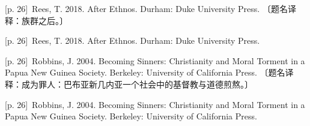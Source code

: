 \documentclass[10pt,a4paper]{article}
\begin{document}
\noindent\begin{minipage}{\textwidth}\begin{minipage}[t]{\dimexpr.5\textwidth-4mm\relax}\noindent\begin{minipage}[t]{\linewidth}{\scriptsize\color{gray} [p. 26]}\ Rees, T. 2018. After Ethnos. Durham: Duke University Press. 〔题名译释：族群之后。〕\par\end{minipage}\par\end{minipage}\hfill\begin{minipage}[t]{\dimexpr.5\textwidth-4mm\relax}\noindent\begin{minipage}[t]{\linewidth}{\scriptsize\color{gray} [p. 26]}\ Rees, T. 2018. After Ethnos. Durham: Duke University Press.\par\end{minipage}\par\end{minipage}\end{minipage}\par
\noindent\begin{minipage}{\textwidth}\begin{minipage}[t]{\dimexpr.5\textwidth-4mm\relax}\noindent\begin{minipage}[t]{\linewidth}{\scriptsize\color{gray} [p. 26]}\ Robbins, J. 2004. Becoming Sinners: Christianity and Moral Torment in a Papua New Guinea Society. Berkeley: University of California Press. 〔题名译释：成为罪人：巴布亚新几内亚一个社会中的基督教与道德煎熬。〕\par\end{minipage}\par\end{minipage}\hfill\begin{minipage}[t]{\dimexpr.5\textwidth-4mm\relax}\noindent\begin{minipage}[t]{\linewidth}{\scriptsize\color{gray} [p. 26]}\ Robbins, J. 2004. Becoming Sinners: Christianity and Moral Torment in a Papua New Guinea Society. Berkeley: University of California Press.\par\end{minipage}\par\end{minipage}\end{minipage}\par
\end{document}
